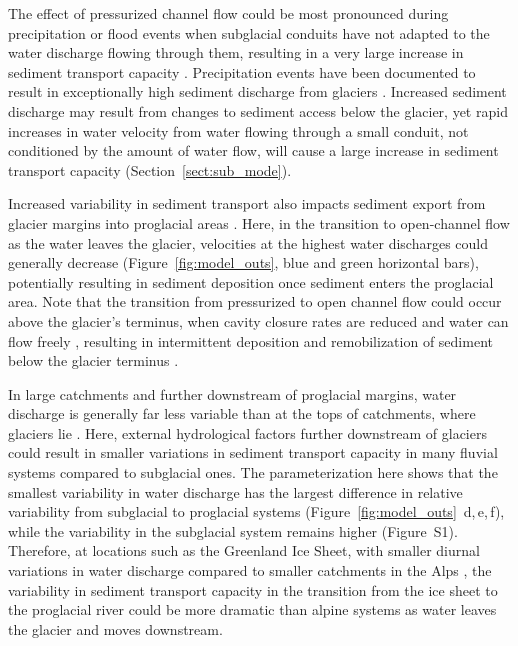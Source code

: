 \documentclass[11pt]{article}
\begin{document}
\begin{spacing}{1}
  The effect of pressurized channel flow could be most pronounced during precipitation or flood events when subglacial conduits have not adapted to the water discharge flowing through them, resulting in a very large increase in sediment transport capacity \citep{delaney2019}.
  Precipitation events have been documented to result in exceptionally high sediment discharge from glaciers \citep{cowan1988,delaney2018}.
  Increased sediment discharge may result from changes to sediment access below the glacier, yet rapid increases in water velocity from water flowing through a small conduit, not conditioned by the amount of water flow, will cause a large increase in sediment transport capacity (Section~\ref{sect:sub_mode}).
  
  Increased variability in sediment transport also impacts sediment export from glacier margins into proglacial areas \citep[e.g.][]{lane2016,delaney2017,perolo2018}.
  Here, in the transition to open-channel flow as the water leaves the glacier, velocities at the highest water discharges could generally decrease (Figure~\ref{fig:model_outs}, blue and green horizontal bars), potentially resulting in sediment deposition once sediment enters the proglacial area.
 Note that the transition from pressurized to open channel flow could occur above the glacier's terminus, when cavity closure rates are reduced and water can flow freely \citep{egli2021b}, resulting in intermittent deposition and remobilization of sediment below the glacier terminus \citep{perolo2018}.
  
  In large catchments and further downstream of proglacial margins, water discharge is generally far less variable than at the tops of catchments, where glaciers lie \citep[c.f.][]{costa2017,vanas2017,delaney2018,hasholt2018}.
  Here, external hydrological factors further downstream of glaciers could result in smaller variations in sediment transport capacity in many fluvial systems compared to subglacial ones.
  The parameterization here shows that the smallest variability in water discharge has the largest difference in relative variability from subglacial to proglacial systems (Figure~\ref{fig:model_outs}\, d,\,e,\,f), while the variability in the subglacial system remains higher (Figure~S1).
  Therefore, at locations such as the Greenland Ice Sheet, with smaller diurnal variations in water discharge compared to smaller catchments in the Alps \citep[c.f.][]{delaney2018,hasholt2018}, the variability in sediment transport capacity in the transition from the ice sheet to the proglacial river could be more dramatic than alpine systems as water leaves the glacier and moves downstream.


\end{spacing}
\end{document}
